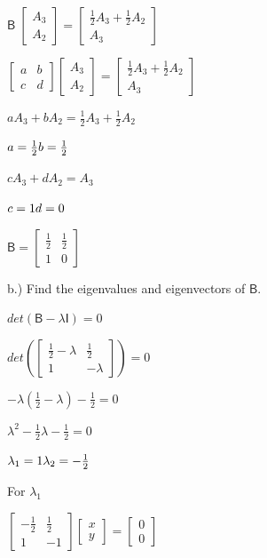 \documentclass[answers, a4paper, 11pt]{exam}
\newcommand{\mat}[1]{\boldsymbol { \mathsf{#1}} }
\begin{document}
\begin{enumerate}
\begin{solution}
    $
\mat{B} \;
\begin{bmatrix}
A_3\\
A_{2}
\end{bmatrix} = 
\begin{bmatrix}
\frac{1}{2} A_3 + \frac{1}{2} A_2 \\
A_{3}
\end{bmatrix}
$

    $
\begin{bmatrix}
a & b \\ c & d 
\end{bmatrix}
\begin{bmatrix}
A_3\\
A_{2}
\end{bmatrix} = 
\begin{bmatrix}
\frac{1}{2} A_3 + \frac{1}{2} A_2 \\
A_{3}
\end{bmatrix}
$

$a A_3 + b A_2 = \frac{1}{2} A_3 + \frac{1}{2} A_2$ 

$a = \frac{1}{2} \\ b = \frac{1}{2}$

$c A_3 + d A_2 = A_3$

$c = 1 \\ d = 0$

$\mat B = 
\begin{bmatrix}
\frac{1}{2} & \frac{1}{2} \\ 1 & 0 
\end{bmatrix}
$
\end{solution}

b.) Find the eigenvalues and eigenvectors of $\mat{B}$.

\begin{solution}

$det(\mat B - \lambda \mat I) = 0$

$
det(\begin{bmatrix}
\frac{1}{2} - \lambda & \frac{1}{2} \\ 1 & - \lambda 
\end{bmatrix}) = 0
$

$-\lambda(\frac{1}{2} - \lambda) - \frac{1}{2} = 0$

$\lambda^2 -\frac{1}{2}\lambda - \frac{1}{2} = 0$

$\lambda_1 = 1 \\ \lambda_2 = -\frac{1}{2}$

For $\lambda_1$

$
\begin{bmatrix}
-\frac{1}{2} & \frac{1}{2} \\ 1 & -1 
\end{bmatrix}
\begin{bmatrix}
 x\\ y 
\end{bmatrix}
= \begin{bmatrix}
0 \\ 0
\end{bmatrix}
$


\end{solution}
\end{enumerate}
\end{document}
